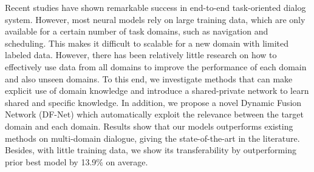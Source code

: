 Recent studies have shown remarkable success in end-to-end task-oriented dialog system. However, most neural models rely on large training data, which are only available for a certain number of task domains, such as navigation and scheduling. This makes it difficult to scalable for a new domain with limited labeled data. However, there has been relatively little research on how to effectively use data from all domains to improve the performance of each domain and also unseen domains. To this end, we investigate methods that can make explicit use of domain knowledge and introduce a shared-private network to learn shared and specific knowledge. In addition, we propose a novel Dynamic Fusion Network (DF-Net) which automatically exploit the relevance between the target domain and each domain. Results show that our models outperforms existing methods on multi-domain dialogue, giving the state-of-the-art in the literature. Besides, with little training data, we show its transferability by outperforming prior best model by 13.9\% on average.
